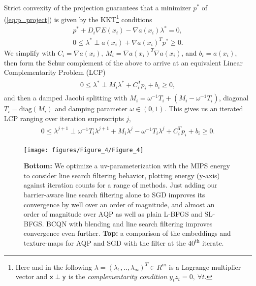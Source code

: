 Strict convexity of the projection guarantees that a minimizer $p^*$ of (\ref{eq:p_project}) is given by the
KKT\footnote{Here and in the following $\lambda = (\lambda_1, ..  ,\lambda_m)^T \in R^m$
is a Lagrange multiplier vector and $\mbox{\textbf{{$\mathsf x$}}} \perp \mbox{\textbf{{$\mathsf y$}}}$ is the \emph{complementarity condition}
$y_t z_t = 0,\ \forall t$.} conditions~\cite{Bertsekas:2016:NOP}
\begin{align}
\label{eq:kkt_prog1}
p^*+ D_i \nabla E(x_i) - \nabla a(x_i) \lambda^* = 0, \\
\label{eq:kkt_prog2}
0 \leq \lambda^* \perp a(x_i) + \nabla a(x_i)^T p^* \geq 0.
\end{align}
We simplify with $C_i = \nabla a(x_i)$, $M_i = \nabla a(x_i)^T \nabla a(x_i)$,
and $b_i = a(x_i)$, then form the Schur complement of the above to arrive at an equivalent
Linear Complementarity Problem (LCP)~\cite{Cottle:2009}
\begin{align}
\label{eq:LCP_proj}
\begin{split}
0 \leq \lambda^* \perp M_i \lambda^* + C_i^T  p_i + b_i \geq 0,
\end{split}
\end{align}
and then a damped Jacobi splitting
with $M_i = \omega^{-1}  T_i +  (M_i - \omega^{-1} T_i)$,
diagonal $T_i = \mathrm{diag}(M_i)$ and damping parameter
$\omega \in (0,1)$. This gives us an iterated LCP ranging over
iteration superscripts $j$,
\begin{align}
\label{eq:LCP_proj_split}
\begin{split}
0 \leq \lambda^{j+1} \perp \omega^{-1} T_i \lambda^{j+1} + M_i \lambda^j - \omega^{-1} T_i \lambda^j + C_i^T  p_i  + b_i \geq 0.
\end{split}
\end{align}

\begin{figure}[t!]
\centering
\texttt{[image: figures/Figure\_4/Figure\_4]}
\caption{
 {\bf Bottom:} We optimize a
uv-parameterization with the MIPS energy to consider line search
filtering behavior, plotting energy (y-axis) against iteration
counts for a range of methods. Just adding our barrier-aware line
search filtering alone to SGD improves its convergence by
well over an order of magnitude, and almost an order of magnitude
over AQP as well as plain L-BFGS and SL-BFGS. BCQN with blending
and line search filtering improves convergence even further.
{\bf Top:} a comparison of the embeddings and texture-maps
for AQP and SGD with the filter at the $40^\textrm{th}$
iterate.
}
\label{fig:combined_method}
\end{figure}


